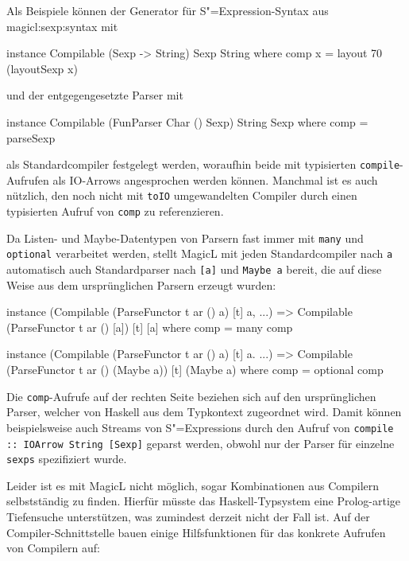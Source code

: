 \documentclass[12pt, a4paper, bibgerm]{scrbook}
\newenvironment{DIFnomarkup}{}{}
\newcommand\icode[1]{\lstinline?#1?}
\newcommand\sref{}
\newcommand{\sexp}{S"=Expression}
\newcommand{\sexps}{S"=Expressions}
\begin{document}
Als Beispiele können der Generator für \sexp{}-Syntax aus
\sref{magicl:sexp:syntax} mit
\begin{DIFnomarkup}\begin{code}
instance Compilable (Sexp -> String) Sexp String where
  comp x = layout 70 (layoutSexp x)
\end{code}\end{DIFnomarkup}
und der entgegengesetzte Parser mit
\begin{DIFnomarkup}\begin{code}
instance Compilable (FunParser Char () Sexp) String Sexp where
  comp = parseSexp
\end{code}\end{DIFnomarkup}
als Standardcompiler festgelegt werden, woraufhin beide mit typisierten
\icode{compile}-Aufrufen als IO-Arrows angesprochen werden
können. Manchmal ist es auch nützlich, den noch nicht mit \icode{toIO}
umgewandelten Compiler durch einen typisierten Aufruf von \icode{comp}
zu referenzieren.

Da Listen- und Maybe-Datentypen von Parsern fast immer mit \icode{many}
und \icode{optional} verarbeitet werden, stellt MagicL mit jeden
Standardcompiler nach \icode{a} automatisch auch Standardparser nach \icode{[a]} und
\icode{Maybe a} bereit, die auf diese Weise aus dem ursprünglichen
Parsern erzeugt wurden:
\begin{DIFnomarkup}\begin{code}
instance (Compilable (ParseFunctor t ar () a) [t] a, ...) =>
  Compilable (ParseFunctor t ar () [a]) [t] [a] where
    comp = many comp

instance (Compilable (ParseFunctor t ar () a) [t] a. ...) =>
  Compilable (ParseFunctor t ar () (Maybe a)) [t] (Maybe a) where
    comp = optional comp
\end{code}\end{DIFnomarkup}
Die \icode{comp}-Aufrufe auf der rechten Seite beziehen sich auf den
ursprünglichen Parser, welcher von Haskell aus dem Typkontext zugeordnet
wird. Damit können beispielsweise auch Streams von \sexps{} durch den
Aufruf von \icode{compile :: IOArrow String [Sexp]} geparst werden,
obwohl nur der Parser für einzelne \icode{sexps} spezifiziert wurde.

Leider ist es mit MagicL nicht möglich, sogar Kombinationen aus
Compilern selbstständig zu finden. Hierfür müsste das Haskell-Typsystem
eine Prolog-artige Tiefensuche unterstützen, was zumindest derzeit nicht
der Fall ist. Auf der Compiler-Schnittstelle bauen einige
Hilfsfunktionen für das konkrete Aufrufen von Compilern auf:
\end{document}
